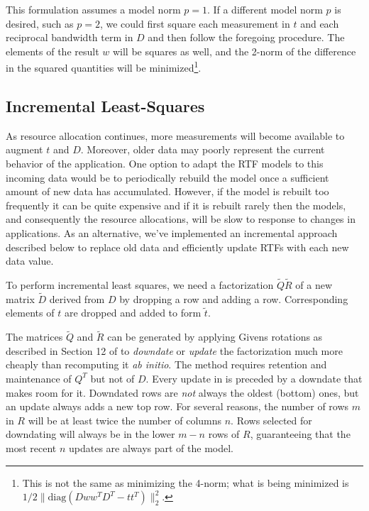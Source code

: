 This formulation assumes a model norm $p = 1$. If a different model norm $p$ is desired, such as $p = 2$, we could first square each measurement in $t$
and each reciprocal bandwidth term in $D$ and then follow the foregoing procedure.
The elements of the result $w$ will be squares as well, and the 2-norm of the difference in the squared quantities will be minimized\footnote{This is not the same as minimizing the 4-norm; what is being minimized is $1/2\|\mbox{diag}(Dww^TD^T - tt^T)\|^2_2$.}.

\subsection*{Incremental Least-Squares}
As resource allocation continues, more measurements will become available to augment $t$ and $D$.
Moreover, older data may poorly represent the current behavior of the application.  One option to adapt the RTF models to this incoming data would be to periodically rebuild the model once a sufficient amount of new data has accumulated.  However, if the model is rebuilt too frequently it can be quite expensive and if it is rebuilt rarely then the models, and consequently the resource allocations, will be slow to response to changes in applications.    As an alternative, we've implemented an incremental approach described below to replace old data and efficiently update RTFs with each new data value.

To perform incremental least squares, we need a factorization $\tilde{Q}\tilde{R}$ of a new matrix $\tilde{D}$
derived from $D$ by dropping a row and adding a row.
Corresponding elements of $t$ are dropped and added to form $\tilde{t}$.

The matrices $\tilde{Q}$ and $\tilde{R}$ can be generated by applying Givens rotations
as described in Section 12 of \cite{GoVL} to \emph{downdate} or \emph{update} the factorization
much more cheaply than recomputing it \emph{ab initio}.
The method requires retention and maintenance of $Q^T$ but not of $D$.
Every update in \pacora is preceded by a downdate that makes room for it.
Downdated rows are \emph{not} always the oldest (bottom) ones, but
an update always adds a new top row.
For several reasons, the number of rows $m$ in $R$
will be at least twice the number of columns $n$.
Rows selected for downdating will always be in the lower $m - n$ rows of $R$,
guaranteeing that the most recent $n$ updates are always part of the model.


